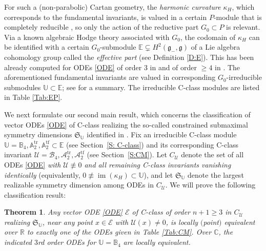 \documentclass[pdftex]{sigma}%
\DeclareMathOperator{\img}{im}
\DeclareMathOperator{\tf}{tf}
\DeclareMathOperator{\tr}{tr}
\newcommand{\g}{\mathfrak{g}}
\newcommand\fS{\mathfrak{S}}
\newcommand{\R}{\mathbb{R}}
\newcommand{\C}{\mathbb{C}}
\newcommand\bbE{\mathbb{E}}
\newcommand\bbU{\mathbb{U}}
\newcommand\bbA{\mathbb{A}}
\newcommand\bbB{\mathbb{B}}
\newcommand\cU{\mathcal{U}}
\newcommand\cA{\mathcal{A}}
\newcommand\cB{\mathcal{B}}
\newcommand\cE{\mathcal{E}}
\numberwithin{equation}{section}
\newtheorem{Theorem}{Theorem}[section]
\begin{document}
For such a (non-parabolic) Cartan geometry, the {\em harmonic curvature} $\kappa_H$, which corresponds to the fundamental invariants, is valued in a certain $P$-module that is completely reducible \cite[Corollary~3.8]{CDT2020}, so only the action of the reductive part $G_0 \subset P$ is relevant. Via a known algebraic Hodge theory associated with $G_0$, the codomain of $\kappa_H$ can be identified with a certain $G_0$-submodule $\bbE \subsetneq H^2(\g_-,\g)$ of a Lie algebra cohomology group called the {\em effective part} (see Definition \ref{D:E}). This has been already computed for ODEs \eqref{ODE} of order $3$ in \cite{Medvedev2010,Medvedev2011} and of order $\ge 4$ in \cite{DM2014}. The aforementioned fundamental invariants are valued in corresponding $G_0$-irreducible submodules $\bbU \subset \bbE$; see \cite[Table 6]{KT2021} for a summary. The irreducible C-class modules are listed in Table \ref{Tab:EP}.

We next formulate our second main result, which concerns the classification of vector ODEs \eqref{ODE} of C-class realizing the so-called constrained submaximal symmetry dimensions $\fS_\bbU$ identified in \cite[Table 2]{KT2021}. Fix an irreducible C-class module $\bbU = \bbB_4, \bbA_2^{\tr}, \bbA_2^{\tf} \subset \bbE$ (see Section~\ref{S: C-class}) and its corresponding C-class invariant $ \cU = \cB_4, \cA_2^{\tr}, \cA_2^{\tf}$ (see Section~\ref{S:CM}). Let $C_\cU$ denote the set of all ODEs \eqref{ODE} {\em with $\cU \not \equiv 0$ and all remaining C-class invariants vanishing identically} (equivalently, $0 \not \equiv \img(\kappa_H) \subset \bbU$), and let $\fS_\bbU$ denote the largest realizable symmetry dimension among ODEs in $C_\cU$. We will prove the following classification result:

\begin{Theorem} \label{T:Main1}
{\em Any} vector ODE \eqref{ODE} $\cE$ of C-class of order $n+1 \ge 3$ in $C_\cU$ realizing $\fS_\bbU$, near any point $x \in \cE$ with $\cU(x)\ne 0$, is {\em locally} $($point$)$ equivalent over $\R$ to exactly one of the ODEs given in Table {\rm \ref{Tab:CM}}. Over $\C$, the indicated $3$rd order ODEs for $\bbU = \bbB_4$ are locally equivalent.
\end{Theorem}
\end{document}
